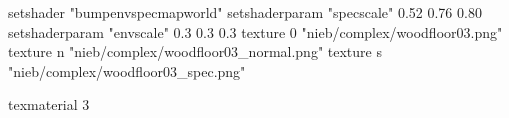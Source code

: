 setshader "bumpenvspecmapworld"
setshaderparam "specscale" 0.52 0.76 0.80
setshaderparam "envscale"  0.3 0.3 0.3
   texture 0 "nieb/complex/woodfloor03.png"
   texture n "nieb/complex/woodfloor03_normal.png"
   texture s "nieb/complex/woodfloor03_spec.png"

texmaterial 3
